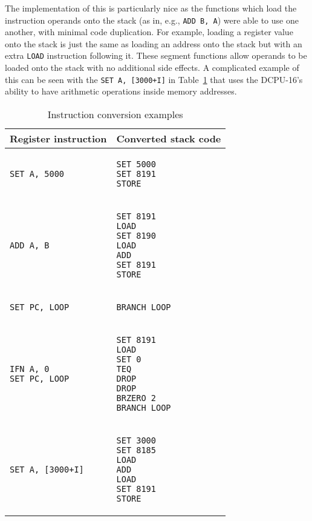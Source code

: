 The implementation of this is particularly nice as the functions which load the
instruction operands onto the stack (as in, e.g., \texttt{ADD B, A}) were able
to use one another, with minimal code duplication. For example, loading a
register value onto the stack is just the same as loading an address onto the
stack but with an extra \texttt{LOAD} instruction following it. These segment
functions allow operands to be loaded onto the stack with no additional side
effects. A complicated example of this can be seen with the \texttt{SET A,
[3000+I]} in Table~\ref{tab:conversionexs} that uses the DCPU-16's ability to
have arithmetic operations inside memory addresses.

\begin{table}
\caption{Instruction conversion examples}
\begin{tabular}{l l}\label{tab:conversionexs}
Register instruction & Converted stack code \\ \toprule
\begin{lstlisting}
SET A, 5000
\end{lstlisting} &
\begin{lstlisting}
SET 5000
SET 8191
STORE
\end{lstlisting} \\ \midrule
\begin{lstlisting}
ADD A, B
\end{lstlisting} &
\begin{lstlisting}
SET 8191
LOAD
SET 8190
LOAD
ADD
SET 8191
STORE
\end{lstlisting} \\ \midrule
\begin{lstlisting}
SET PC, LOOP
\end{lstlisting} &
\begin{lstlisting}
BRANCH LOOP
\end{lstlisting} \\ \midrule
\begin{lstlisting}
IFN A, 0
SET PC, LOOP
\end{lstlisting} &
\begin{lstlisting}
SET 8191
LOAD
SET 0
TEQ
DROP
DROP
BRZERO 2
BRANCH LOOP
\end{lstlisting} \\ \midrule
\begin{lstlisting}
SET A, [3000+I]
\end{lstlisting} &
\begin{lstlisting}
SET 3000
SET 8185
LOAD
ADD
LOAD
SET 8191
STORE
\end{lstlisting} \\
\end{tabular}
\end{table}


